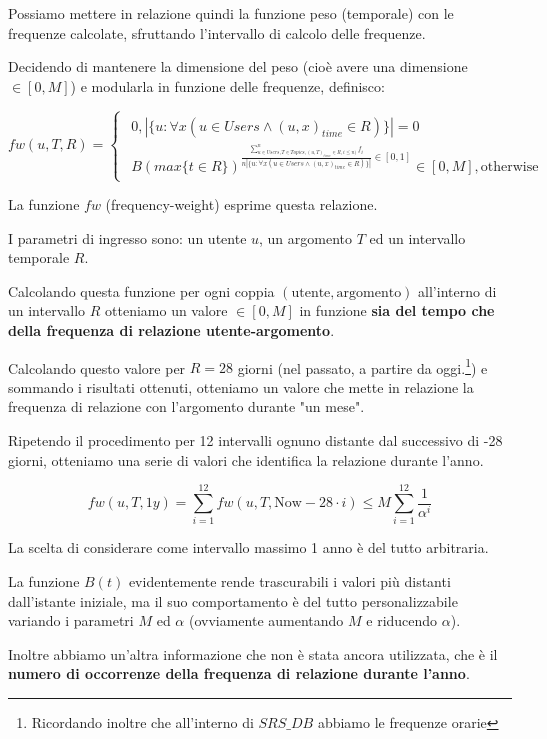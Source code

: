 {Possiamo mettere in relazione quindi la funzione peso (temporale) con le frequenze calcolate, sfruttando l'intervallo di calcolo delle frequenze.

Decidendo di mantenere la dimensione del peso (cioè avere una dimensione $\in [0,M]$) e modularla in funzione delle frequenze, definisco:

$$ fw(u,T,R) = \begin{cases}\begin{aligned} 0, |\{u : \forall x( u \in Users \land (u,x)_{time} \in R)\}| = 0 \\ B(max\{t \in R\})^{ \frac{ \sum\limits_{u \in Users, T \in Topics, (u,T)_{time} \in R, i \leq n)}^{n}{f_i} } {n |\{u : \forall x( u \in Users \land (u,x)_{time} \in R)\}|} \in [0,1]} \in [0,M], \text{otherwise} \end{aligned} \end{cases} $$

La funzione $fw$ (frequency-weight) esprime questa relazione.


I parametri di ingresso sono: un utente $u$, un argomento $T$ ed un intervallo temporale $R$.

Calcolando questa funzione per ogni coppia $(\text{utente}, \text{argomento})$ all'interno di un intervallo $R$ otteniamo un valore $\in [0,M]$ in funzione \textbf{sia del tempo che della frequenza di relazione utente-argomento}.

Calcolando questo valore per $R = 28$ giorni (nel passato, a partire da oggi.\footnote{Ricordando inoltre che all'interno di $SRS\_DB$ abbiamo le frequenze orarie}) e sommando i risultati ottenuti, otteniamo un valore che mette in relazione la frequenza di relazione con l'argomento durante "un mese".


Ripetendo il procedimento per 12 intervalli ognuno distante dal successivo di -28 giorni, otteniamo una serie di valori che identifica la relazione durante l'anno.

$$ fw(u,T, 1y) = \sum\limits_{i=1}^{12}{fw(u,T, \text{Now} - 28\cdot i)} \leq M\sum\limits_{i=1}^{12}{\frac{1}{\alpha^i}} $$

La scelta di considerare come intervallo massimo 1 anno è del tutto arbitraria.

La funzione $B(t)$ evidentemente rende trascurabili i valori più distanti dall'istante iniziale, ma il suo comportamento è del tutto personalizzabile variando i parametri $M$ ed $\alpha$ (ovviamente aumentando $M$ e riducendo $\alpha$).

Inoltre abbiamo un'altra informazione che non è stata ancora utilizzata, che è il \textbf{numero di occorrenze della frequenza di relazione durante l'anno}.

}
